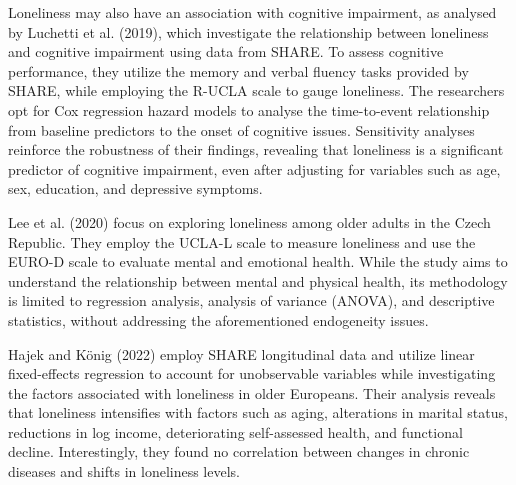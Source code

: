     Loneliness may also have an association with cognitive impairment, as analysed by Luchetti et al. (2019), which investigate the relationship between loneliness and cognitive impairment using data from SHARE. To assess cognitive performance, they utilize the memory and verbal fluency tasks provided by SHARE, while employing the R-UCLA scale to gauge loneliness. The researchers opt for Cox regression hazard models to analyse the time-to-event relationship from baseline predictors to the onset of cognitive issues. Sensitivity analyses reinforce the robustness of their findings, revealing that loneliness is a significant predictor of cognitive impairment, even after adjusting for variables such as age, sex, education, and depressive symptoms.

    Lee et al. (2020) focus on exploring loneliness among older adults in the Czech Republic. They employ the UCLA-L scale to measure loneliness and use the EURO-D scale to evaluate mental and emotional health. While the study aims to understand the relationship between mental and physical health, its methodology is limited to regression analysis, analysis of variance (ANOVA), and descriptive statistics, without addressing the aforementioned endogeneity issues.

    Hajek and König (2022) employ SHARE longitudinal data and utilize linear fixed-effects regression to account for unobservable variables while investigating the factors associated with loneliness in older Europeans. Their analysis reveals that loneliness intensifies with factors such as aging, alterations in marital status, reductions in log income, deteriorating self-assessed health, and functional decline. Interestingly, they found no correlation between changes in chronic diseases and shifts in loneliness levels.

